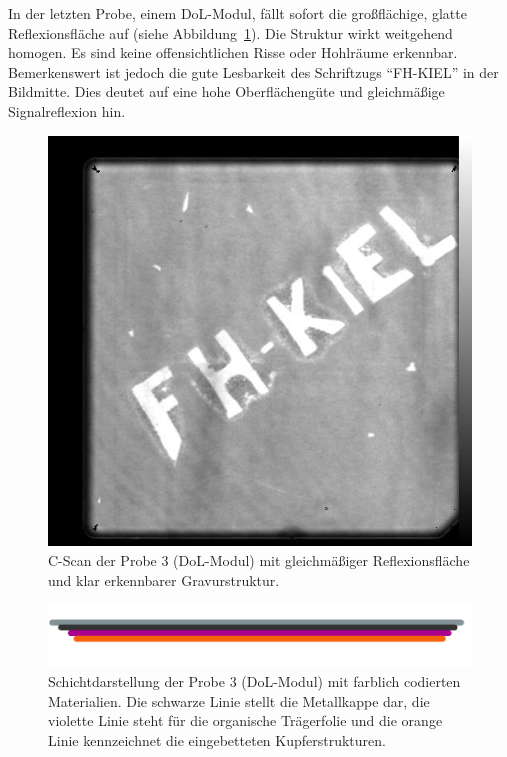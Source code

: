 In der letzten Probe, einem DoL-Modul, fällt sofort die großflächige, glatte Reflexionsfläche auf (siehe Abbildung~\ref{Abbildung 12:probe3}). Die Struktur wirkt weitgehend homogen. Es sind keine offensichtlichen Risse oder Hohlräume erkennbar. Bemerkenswert ist jedoch die gute Lesbarkeit des Schriftzugs \enquote{FH-KIEL} in der Bildmitte. Dies deutet auf eine hohe Oberflächengüte und gleichmäßige Signalreflexion hin.
\vspace{0.2cm}
\begin{figure}[htbp]
    \centering
    \includegraphics[scale=0.30]{Bilder/Probe3_i795_c.jpg}
    \caption{C-Scan der Probe 3 (DoL-Modul) mit gleichmäßiger Reflexionsfläche und klar erkennbarer Gravurstruktur.}
    \label{Abbildung 12:probe3}
\end{figure}
\begin{figure}[htbp]
    \centering
    \includegraphics[scale=0.75]{Bilder/probelinie3}
    \caption{Schichtdarstellung der Probe 3 (DoL-Modul) mit farblich codierten Materialien. Die schwarze Linie stellt die Metallkappe dar, die violette Linie steht für die organische Trägerfolie und die orange Linie kennzeichnet die eingebetteten Kupferstrukturen.}
    \label{Abbildung 13 :Schichtdarstellung der Probe 3 (DoL-Modul) mit farblich codierten Materialien. Die schwarze Linie stellt die Metallkappe dar, die violette Linie steht für die organische Trägerfolie und die orange Linie kennzeichnet die eingebetteten Kupferstrukturen.}
\end{figure}